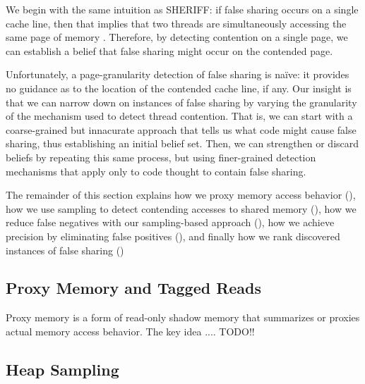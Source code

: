 \documentclass{sig-alternate}
\begin{document}
We begin with the same intuition as SHERIFF: if false sharing occurs on a single cache line, then that implies that two
threads are simultaneously accessing the same page of memory \cite{SHERIFF}. Therefore, by detecting contention on
a single page, we can establish a belief that false sharing might occur on the contended page.

Unfortunately, a page-granularity detection of false sharing is na{\"i}ve: it provides no guidance as to the location of the
contended cache line, if any. Our insight is that we can narrow down on instances of false sharing by varying the
granularity of the mechanism used to detect thread contention. That is, we can start with a coarse-grained but
innacurate approach that tells us what code might cause false sharing, thus establishing an initial belief set. Then, we
can strengthen or discard beliefs by repeating this same process, but using finer-grained detection mechanisms that
apply only to code thought to contain false sharing.

The remainder of this section explains how we proxy memory access behavior (), how we use sampling
to detect contending accesses to shared memory (), how we reduce false negatives with our
sampling-based approach (), how we achieve precision by eliminating false positives (),
and finally how we rank discovered instances of false sharing ()

\subsection{Proxy Memory and Tagged Reads}\label{sec:proxymem}

Proxy memory is a form of read-only shadow memory that summarizes or proxies actual memory access behavior. The key
idea  .... TODO!!

\subsection{Heap Sampling}\label{sec:heapsample}
\end{document}
